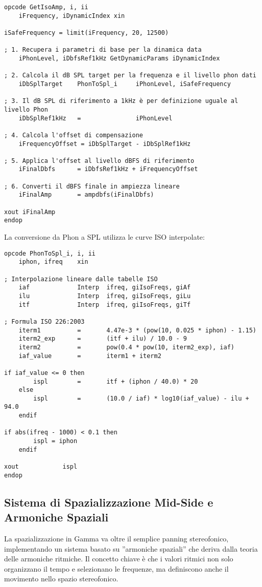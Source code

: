 \begin{lstlisting}[language=Csound]
opcode GetIsoAmp, i, ii
    iFrequency, iDynamicIndex xin

iSafeFrequency = limit(iFrequency, 20, 12500)

; 1. Recupera i parametri di base per la dinamica data
    iPhonLevel, iDbfsRef1kHz GetDynamicParams iDynamicIndex

; 2. Calcola il dB SPL target per la frequenza e il livello phon dati
    iDbSplTarget    PhonToSpl_i     iPhonLevel, iSafeFrequency

; 3. Il dB SPL di riferimento a 1kHz è per definizione uguale al livello Phon
    iDbSplRef1kHz   =               iPhonLevel

; 4. Calcola l'offset di compensazione
    iFrequencyOffset = iDbSplTarget - iDbSplRef1kHz

; 5. Applica l'offset al livello dBFS di riferimento
    iFinalDbfs      = iDbfsRef1kHz + iFrequencyOffset

; 6. Converti il dBFS finale in ampiezza lineare
    iFinalAmp       = ampdbfs(iFinalDbfs)

xout iFinalAmp
endop
\end{lstlisting}

La conversione da Phon a SPL utilizza le curve ISO interpolate:

\begin{lstlisting}[language=Csound]
opcode PhonToSpl_i, i, ii
    iphon, ifreq    xin

; Interpolazione lineare dalle tabelle ISO
    iaf             Interp  ifreq, giIsoFreqs, giAf
    ilu             Interp  ifreq, giIsoFreqs, giLu
    itf             Interp  ifreq, giIsoFreqs, giTf

; Formula ISO 226:2003
    iterm1          =       4.47e-3 * (pow(10, 0.025 * iphon) - 1.15)
    iterm2_exp      =       (itf + ilu) / 10.0 - 9
    iterm2          =       pow(0.4 * pow(10, iterm2_exp), iaf)
    iaf_value       =       iterm1 + iterm2

if iaf_value <= 0 then
        ispl        =       itf + (iphon / 40.0) * 20
    else
        ispl        =       (10.0 / iaf) * log10(iaf_value) - ilu + 94.0
    endif

if abs(ifreq - 1000) < 0.1 then
        ispl = iphon
    endif

xout            ispl
endop
\end{lstlisting}
\subsection{Sistema di Spazializzazione Mid-Side e Armoniche Spaziali}
La spazializzazione in Gamma va oltre il semplice panning stereofonico, implementando un sistema basato su ''armoniche spaziali'' che deriva dalla teoria delle armoniche ritmiche. Il concetto chiave è che i valori ritmici non solo organizzano il tempo e selezionano le frequenze, ma definiscono anche il movimento nello spazio stereofonico.

